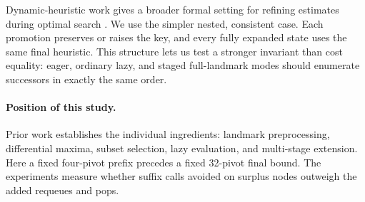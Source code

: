 Dynamic-heuristic work gives a broader formal setting for refining estimates
during optimal search \citep{christen2025dynamic}.  We use the simpler nested,
consistent case.  Each promotion preserves or raises the key, and every
fully expanded state uses the same final heuristic.  This structure lets us
test a stronger invariant than cost equality: eager, ordinary lazy, and
staged full-landmark modes should enumerate successors in exactly the same
order.

\paragraph{Position of this study.}
Prior work establishes the individual ingredients: landmark preprocessing,
differential maxima, subset selection, lazy evaluation, and multi-stage
extension.  Here a fixed four-pivot prefix precedes a fixed 32-pivot final
bound.  The experiments measure whether suffix calls avoided on surplus nodes
outweigh the added requeues and pops.
